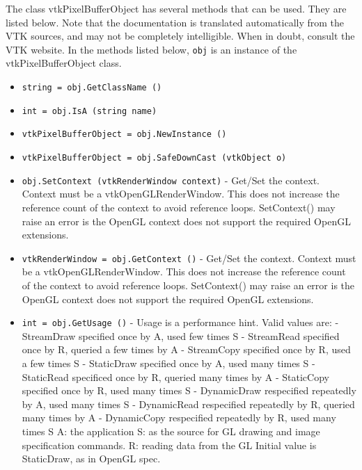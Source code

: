 The class vtkPixelBufferObject has several methods that can be used.
  They are listed below.
Note that the documentation is translated automatically from the VTK sources,
and may not be completely intelligible.  When in doubt, consult the VTK website.
In the methods listed below, \verb|obj| is an instance of the vtkPixelBufferObject class.
\begin{itemize}
\item  \verb|string = obj.GetClassName ()|

\item  \verb|int = obj.IsA (string name)|

\item  \verb|vtkPixelBufferObject = obj.NewInstance ()|

\item  \verb|vtkPixelBufferObject = obj.SafeDownCast (vtkObject o)|

\item  \verb|obj.SetContext (vtkRenderWindow context)| -  Get/Set the context. Context must be a vtkOpenGLRenderWindow. 
 This does not increase the reference count of the 
 context to avoid reference loops.
 SetContext() may raise an error is the OpenGL context does not support the
 required OpenGL extensions.

\item  \verb|vtkRenderWindow = obj.GetContext ()| -  Get/Set the context. Context must be a vtkOpenGLRenderWindow. 
 This does not increase the reference count of the 
 context to avoid reference loops.
 SetContext() may raise an error is the OpenGL context does not support the
 required OpenGL extensions.

\item  \verb|int = obj.GetUsage ()| -  Usage is a performance hint.
 Valid values are:
 - StreamDraw specified once by A, used few times S
 - StreamRead specified once by R, queried a few times by A
 - StreamCopy specified once by R, used a few times S
 - StaticDraw specified once by A, used many times S
 - StaticRead specificed once by R, queried many times by A
 - StaticCopy specified once by R, used many times S
 - DynamicDraw respecified repeatedly by A, used many times S
 - DynamicRead respecified repeatedly by R, queried many times by A
 - DynamicCopy respecified repeatedly by R, used many times S
 A: the application
 S: as the source for GL drawing and image specification commands.
 R: reading data from the GL
 Initial value is StaticDraw, as in OpenGL spec.


\end{itemize}
